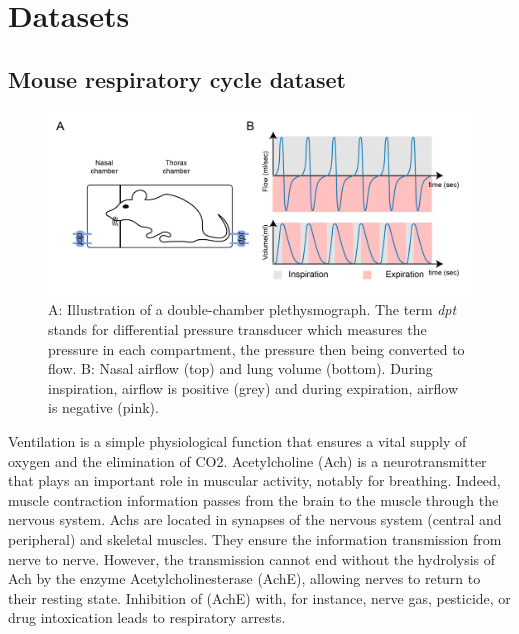\section{Datasets}
\subsection{Mouse respiratory cycle dataset}

\begin{figure}
  \centering
  \includegraphics[width = \linewidth]{pictures/mice_exp.png}
  \caption{A: Illustration of a double-chamber plethysmograph. The term \textit{dpt} stands for differential 
  pressure transducer which measures the pressure in each compartment, the pressure then being converted to flow. 
  B: Nasal airflow (top) and lung volume (bottom). During inspiration, airflow is positive (grey) and during
  expiration, airflow is negative (pink).}
  \label{fig:mice_exp}
\end{figure}

\label{appendix:mouse_dataset}
Ventilation is a simple physiological function that ensures a vital supply of oxygen and the elimination of CO2. 
Acetylcholine (Ach) is a neurotransmitter that plays an important role in muscular activity, notably for breathing. 
Indeed, muscle contraction information passes from the brain to the muscle through the nervous system. Achs are located 
in synapses of the nervous system (central and peripheral) and skeletal muscles. They ensure the information transmission 
from nerve to nerve. However, the transmission cannot end without the hydrolysis of Ach by the enzyme Acetylcholinesterase 
(AchE), allowing nerves to return to their resting state. Inhibition of (AchE) with, for instance, nerve gas, pesticide, 
or drug intoxication leads to respiratory arrests. 

